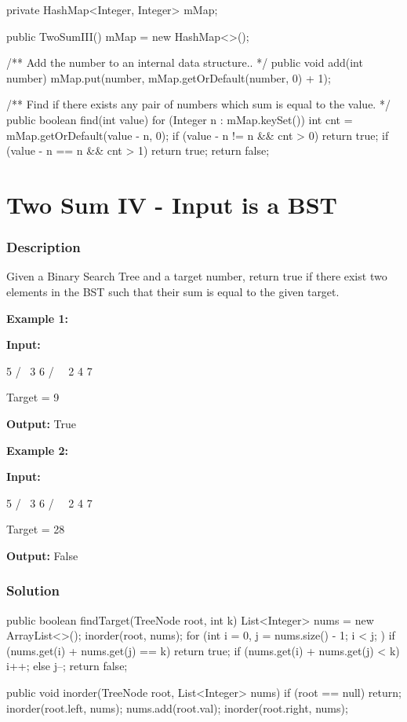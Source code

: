 \begin{Code}
private HashMap<Integer, Integer> mMap;

public TwoSumIII() {
    mMap = new HashMap<>();
}

/** Add the number to an internal data structure.. */
public void add(int number) {
    mMap.put(number, mMap.getOrDefault(number, 0) + 1);
}

/** Find if there exists any pair of numbers which sum is equal to the value. */
public boolean find(int value) {
    for (Integer n : mMap.keySet()) {
        int cnt = mMap.getOrDefault(value - n, 0);
        if (value - n != n && cnt > 0) {
            return true;
        }
        if (value - n == n && cnt > 1) {
            return true;
        }
    }
    return false;
}
\end{Code}

\newpage

\section{Two Sum IV - Input is a BST} %

\subsubsection{Description}
Given a Binary Search Tree and a target number, return true if there exist two elements in the BST such that their sum is equal to the given target.

\textbf{Example 1:}

\textbf{Input:}
\begin{Code}
    5
   / \
  3   6
 / \   \
2   4   7
\end{Code}

Target = 9

\textbf{Output:} True

\textbf{Example 2:}

\textbf{Input:}
\begin{Code}
    5
   / \
  3   6
 / \   \
2   4   7
\end{Code}

Target = 28

\textbf{Output:} False

\subsubsection{Solution}

\begin{Code}
public boolean findTarget(TreeNode root, int k) {
    List<Integer> nums = new ArrayList<>();
    inorder(root, nums);
    for (int i = 0, j = nums.size() - 1; i < j; ) {
        if (nums.get(i) + nums.get(j) == k) return true;
        if (nums.get(i) + nums.get(j) < k) i++;
        else j--;
    }
    return false;
}

public void inorder(TreeNode root, List<Integer> nums) {
    if (root == null) return;
    inorder(root.left, nums);
    nums.add(root.val);
    inorder(root.right, nums);
}
\end{Code}

